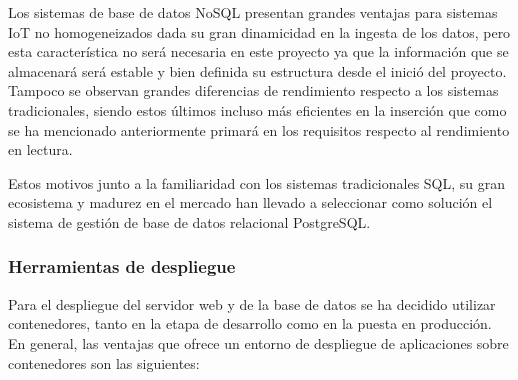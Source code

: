 \documentclass[../proyecto.tex]{subfiles}
\begin{document}
Los sistemas de base de datos NoSQL presentan grandes ventajas para sistemas IoT no homogeneizados dada su gran dinamicidad en la ingesta de los datos, pero esta característica no será necesaria en este proyecto ya que la información que se almacenará será estable y bien definida su estructura desde el inició del proyecto. Tampoco se observan grandes diferencias de rendimiento respecto a los sistemas tradicionales, siendo estos últimos incluso más eficientes en la inserción \cite{ASIMINIDIS2018} \cite{RAUTMARE2016} que como se ha mencionado anteriormente primará en los requisitos respecto al rendimiento en lectura.

Estos motivos junto a la familiaridad con los sistemas tradicionales SQL, su gran ecosistema y madurez en el mercado han llevado a seleccionar como solución el sistema de gestión de base de datos relacional PostgreSQL.

\subsubsection{Herramientas de despliegue}

Para el despliegue del servidor web y de la base de datos se ha decidido utilizar contenedores, tanto en la etapa de desarrollo como en la puesta en producción. En general, las ventajas que ofrece un entorno de despliegue de aplicaciones sobre contenedores son las siguientes:\\
\end{document}
